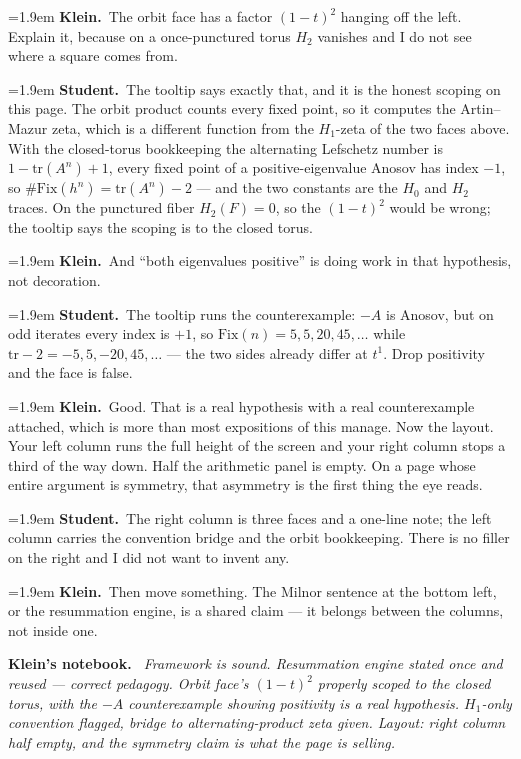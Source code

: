 \documentclass[11pt]{article}
\newcommand{\Stu}[1]{\par\smallskip\noindent\hangindent=1.9em\hangafter=1%
  \textcolor{stucol}{\textbf{Student.}}~#1\par}
\newcommand{\Kle}[1]{\par\smallskip\noindent\hangindent=1.9em\hangafter=1%
  \textcolor{klecol}{\textbf{Klein.}}~#1\par}
\newenvironment{knote}%
  {\begin{snugshade}\small\noindent\textbf{\textcolor{klecol}{Klein's notebook.}}\itshape\ }%
  {\end{snugshade}}
\begin{document}
\Kle{The orbit face has a factor $(1-t)^2$ hanging off the left. Explain it, because on a once-punctured torus $H_2$ vanishes and I do not see where a square comes from.}

\Stu{The tooltip says exactly that, and it is the honest scoping on this page. The orbit product counts every fixed point, so it computes the Artin--Mazur zeta, which is a different function from the $H_1$-zeta of the two faces above. With the closed-torus bookkeeping the alternating Lefschetz number is $1 - \mathrm{tr}(A^n) + 1$, every fixed point of a positive-eigenvalue Anosov has index $-1$, so $\#\mathrm{Fix}(h^n) = \mathrm{tr}(A^n) - 2$ --- and the two constants are the $H_0$ and $H_2$ traces. On the punctured fiber $H_2(F) = 0$, so the $(1-t)^2$ would be wrong; the tooltip says the scoping is to the closed torus.}

\Kle{And ``both eigenvalues positive'' is doing work in that hypothesis, not decoration.}

\Stu{The tooltip runs the counterexample: $-A$ is Anosov, but on odd iterates every index is $+1$, so $\mathrm{Fix}(n) = 5, 5, 20, 45, \ldots$ while $\mathrm{tr} - 2 = -5, 5, -20, 45, \ldots$ --- the two sides already differ at $t^1$. Drop positivity and the face is false.}

\Kle{Good. That is a real hypothesis with a real counterexample attached, which is more than most expositions of this manage. Now the layout. Your left column runs the full height of the screen and your right column stops a third of the way down. Half the arithmetic panel is empty. On a page whose entire argument is symmetry, that asymmetry is the first thing the eye reads.}

\Stu{The right column is three faces and a one-line note; the left column carries the convention bridge and the orbit bookkeeping. There is no filler on the right and I did not want to invent any.}

\Kle{Then move something. The Milnor sentence at the bottom left, or the resummation engine, is a shared claim --- it belongs between the columns, not inside one.}

\begin{knote}
Framework is sound. Resummation engine stated once and reused --- correct pedagogy. Orbit face's $(1-t)^2$ properly scoped to the closed torus, with the $-A$ counterexample showing positivity is a real hypothesis. $H_1$-only convention flagged, bridge to alternating-product zeta given. Layout: right column half empty, and the symmetry claim is what the page is selling.
\end{knote}
\end{document}
